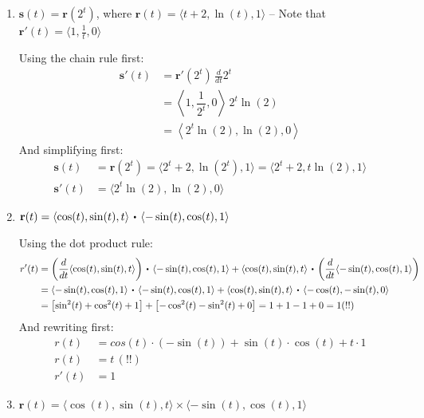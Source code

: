 \documentclass[10pt]{article}
\newcommand{\vr}{\mathbf{r}}
\newcommand{\vs}{\mathbf{s}}
\newcommand\dotp[1][.5]{\,\mathbin{\vcenter{\hbox{\scalebox{#1}{$\bullet$}}}}\,}
\newenvironment{red}{\color{red}}{\ignorespacesafterend}
\begin{document}
\begin{enumerate}[leftmargin=0pt]
\begin{enumerate}
    \item $\vs(t) = \vr(2^t)$, where $\vr(t) = \langle t+2, \ln(t), 1 \rangle$ \begin{red}
        -- Note that $\vr'(t) = \langle 1, \frac1t, 0 \rangle$
    \end{red}
    
    \begin{red}
        Using the chain rule first:
        \begin{align*}
            \vs'(t) &= \vr'(2^t)\, \frac{d}{dt}2^t \\
            &=\left\langle 1, \dfrac{1}{2^t}, 0\right\rangle
            \, 2^t \ln(2) \\
            &= \left\langle 2^t \ln(2), \ln(2), 0 \right\rangle
        \end{align*}
        And simplifying first:
        \begin{align*}
            \vs(t) &= \vr(2^t) = \langle 2^t + 2, \ln(2^t), 1\rangle 
            = \langle 2^t + 2, t\ln(2), 1\rangle \\
            \vs'(t) &= \langle 2^t \ln(2), \ln(2), 0 \rangle
        \end{align*}
    \end{red}
    \item $\displaystyle \vr(t) = \langle \cos(t), \sin(t), t \rangle \dotp \langle -\sin(t), \cos(t), 1 \rangle$
    
    \begin{red}
        Using the dot product rule:
        \begin{align*}
            r'(t) &= \left(\frac{d}{dt}\langle \cos(t), \sin(t), t \rangle \right)\dotp \langle -\sin(t), \cos(t), 1 \rangle
            + \langle \cos(t), \sin(t), t \rangle \dotp \left(\frac{d}{dt} \langle -\sin(t), \cos(t), 1 \rangle\right) \\
            &= \langle -\sin(t), \cos(t), 1 \rangle \dotp \langle -\sin(t), \cos(t), 1 \rangle 
            + \langle \cos(t), \sin(t), t \rangle \dotp \langle -\cos(t), -\sin(t), 0\rangle \\
            &= \left[ \sin^2(t) + \cos^2(t) + 1 \right]
            + \left[ -\cos^2(t) -\sin^2(t) + 0\right] = 1 + 1 - 1 + 0 = 1 (!!)
        \end{align*}
        And rewriting first:
        \begin{align*}
            r(t) &= cos(t)\cdot(-\sin(t)) + \sin(t)\cdot\cos(t) + t\cdot 1 \\
            r(t) &= t \, (!!) \\
            r'(t) &= 1
        \end{align*}
    \end{red}
    \item $\displaystyle \vr(t) = \langle \cos(t), \sin(t), t \rangle \times \langle -\sin(t), \cos(t), 1 \rangle$
    

\end{enumerate}
\end{enumerate}
\end{document}
